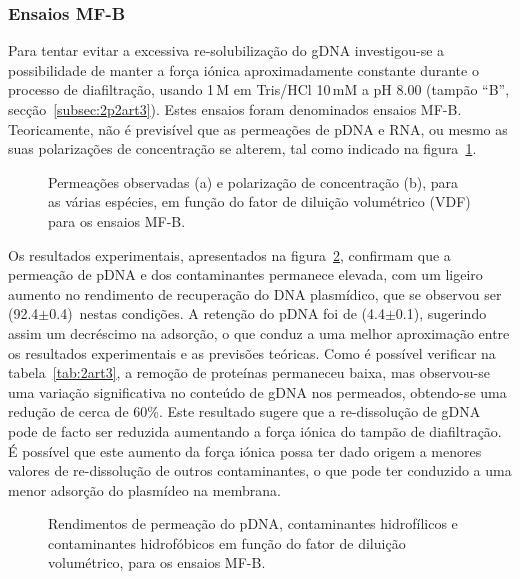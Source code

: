 \subsubsection{Ensaios MF-B}
\label{subsubsec:3p1p3art3}
%
Para tentar evitar a excessiva re-solubilização do gDNA investigou-se a possibilidade de manter a força iónica aproximadamente constante durante o processo de diafiltração, usando  1\,M em Tris/HCl 10\,mM a pH 8.00 (tampão ``B'', secção~\ref{subsec:2p2art3}).
%
Estes ensaios foram denominados ensaios MF-B. Teoricamente, não é previsível que as permeações de pDNA e RNA, ou mesmo as suas polarizações de concentração se alterem, tal como indicado na figura~\ref{fig:3acart3}.
\begin{figure}
	\centering
	
	\caption[Previsão das permeações e da polarização de concentração (MF-B)]{Permeações observadas (a) e polarização de concentração (b), para as várias espécies, em função do fator de diluição volumétrico (VDF) para os ensaios MF-B.}
	\label{fig:3acart3}
\end{figure}

Os resultados experimentais, apresentados na figura~\ref{fig:3eart3}, confirmam que a permeação de pDNA e dos contaminantes permanece elevada, com um ligeiro aumento no rendimento de recuperação do DNA plasmídico, que se observou ser (92.4$\pm$0.4)\porcento\ nestas condições. A retenção do pDNA foi de (4.4$\pm$0.1)\porcento, sugerindo assim um decréscimo na adsorção, o que conduz a uma melhor aproximação entre os resultados experimentais e as previsões teóricas. Como é possível verificar na tabela~\ref{tab:2art3}, a remoção de proteínas permaneceu baixa, mas observou-se uma variação significativa no conteúdo de gDNA nos permeados, obtendo-se uma redução de cerca de 60\%.
%
%
Este resultado sugere que a re-dissolução de gDNA pode de facto ser reduzida aumentando a força iónica do tampão de diafiltração. É possível que este aumento da força iónica possa ter dado origem a menores valores de re-dissolução de outros contaminantes, o que pode ter conduzido a uma menor adsorção do plasmídeo na membrana. 
\begin{figure}
	\centering
	\setlength\figureheight{6cm} 
	\setlength\figurewidth{6cm}
	
	\caption[Rendimentos de permeação de pDNA e contaminantes (MF-B)]{Rendimentos de permeação do pDNA, contaminantes hidrofílicos e contaminantes hidrofóbicos em função do fator de diluição volumétrico, para os ensaios MF-B.}
	\label{fig:3eart3}
\end{figure}

